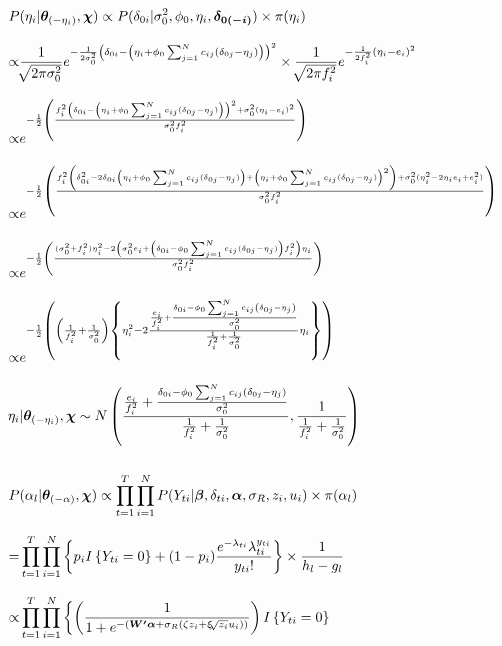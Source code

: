 \documentclass[12pt,a4paper]{article}
\begin{document}
\begin{CJK}{UTF8}{bkai}
\begin{align*}
 P & (\eta_i|\bm{\theta}_{(-\eta_i)},\bm{\chi}) \propto  P(\delta_{0i}|\sigma_0^2,\phi_0,\eta_i,\bm{\delta_{0(-i)}}) \times \pi(\eta_i)\\[3mm]
 \propto  &
 \frac{1}{\sqrt[]{2 \pi \sigma_0^2}}e^{-\frac{1}{2\sigma_0^2}\left(\delta_{0i}-\left(\eta_i+\phi_0\sum_{j=1}^N c_{ij}\left(\delta_{0j}-\eta_j\right)\right)\right)^2} \times \frac{1}{\sqrt[]{2 \pi f_i^2}} e^{-\frac{1}{2 f_i^2}\left(\eta_i-e_i\right)^2} \\[3mm]
 \propto  &    e^{-\frac{1}{2}\left(\frac{f_i^2\left(\delta_{0i}-\left(\eta_i+\phi_0\sum_{j=1}^N c_{ij}(\delta_{0j}-\eta_j)\right)\right)^2+\sigma_0^2(\eta_i-e_i)^2}{\sigma_0^2f_i^2}\right)}  \\[3mm]
 \propto  &  e^{-\frac{1}{2}\left(\frac{f_i^2\left(\delta_{0i}^2-2\delta_{0i}\left(\eta_i+\phi_0\sum_{j=1}^N c_{ij}(\delta_{0j}-\eta_j)\right)+\left(\eta_i+\phi_0\sum_{j=1}^N c_{ij}(\delta_{0j}-\eta_j)\right)^2 \right)+\sigma_0^2(\eta_i^2-2\eta_i e_i+e_i^2)}{\sigma_0^2f_i^2}\right)}\\[3mm]
 \propto  &   e^{-\frac{1}{2}\left(\frac{(\sigma_0^2+f_i^2)\eta_i^2-2\left(\sigma_0^2 e_i+\left(\delta_{0i}-\phi_0\sum_{j=1}^N c_{ij}(\delta_{0j}-\eta_j)\right)f_i^2\right)\eta_i}{\sigma_0^2f_i^2}\right)} \\[3mm]
 \propto  &  e^{-\frac{1}{2}\left(\left(\frac{1}{f_i^2}+\frac{1}{\sigma_0^2}\right)\left\{\eta_i^2-2\frac{\frac{e_i}{f_i^2}+\frac{\delta_{0i}-\phi_0\sum_{j =1}^N c_{ij}\left(\delta_{0j}-\eta_j\right)}{\sigma_0^2}}{\frac{1}{f_i^2}+\frac{1}{\sigma_0^2}}\eta_i\right\}\right)}\\[3mm]
 \eta_i & |\bm{\theta}_{(-\eta_i)},\bm{\chi} \sim N\left(\frac{\frac{e_i}{f_i^2}+\frac{\delta_{0i}-\phi_0\sum_{j=1}^N c_{ij}\left(\delta_{0j}-\eta_j\right)}{\sigma_0^2}}{\frac{1}{f_i^2}+\frac{1}{\sigma_0^2}},\frac{1}{\frac{1}{f_i^2}+\frac{1}{\sigma_0^2}}\right)
\\ \hspace*{\fill} \\
 P & (\alpha_l|\bm{\theta}_{(-\alpha)},\bm{\chi}) \propto \prod_{t=1}^T \prod_{i=1}^N P(Y_{ti}|\bm{\beta},\delta_{ti},\bm{\alpha},\sigma_R,z_i,u_i) \times \pi(\alpha_l) \\[3mm]
  = &
\prod_{t=1}^T\prod_{i=1}^N \left\{ p_i I \left\{ Y_{ti} = 0 \right\}+(1-p_i)\frac{e^{-\lambda_{ti}}\lambda_{ti}^{y_{ti}}}{y_{ti}!}\right\} \times \frac{1}{h_l-g_l} \\[3mm]
 \propto &
\prod_{t=1}^T\prod_{i=1}^N \left\{ \left( \frac{1}{1+e^{-(\bm{W^\prime}\bm{\alpha}+\sigma_R(\zeta z_i+\xi \sqrt[]{z_i} u_i))}} \right)I\left\{ Y_{ti} = 0\right\} \right.\\[3mm]

\end{align*}
\end{CJK}
\end{document}
